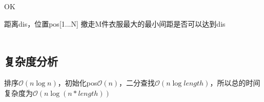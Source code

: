 \documentclass[UTF8]{ctexart}
\begin{document}
\renewcommand{\algorithmicrequire}{\textbf{输入:}}
\renewcommand{\algorithmicensure}{\textbf{输出:}}
\begin{algorithm}
	\caption{OK}
	\begin{algorithmic}[1]
	\Require 距离dis，位置pos[1...N]
	\Ensure 撤走M件衣服最大的最小间距是否可以达到dis
		\EndWhile
		\\
			\quad\quad\quad{}
		\EndIf
	\EndFor\\
	\end{algorithmic}
\end{algorithm}

\subsection{复杂度分析}
排序$\mathcal{O}(n\log n)$，初始化pos$\mathcal{O}(n)$，二分查找$\mathcal{O}(n\log length)$，所以总的时间复杂度为$\mathcal{O}(n\log (n*length))$
\end{document}
